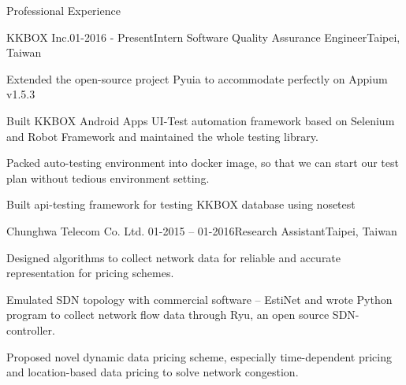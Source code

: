 \documentclass[letterpaper]{resume} %
\begin{document}
\begin{rSection}{Professional Experience}
\begin{rSubsection}{KKBOX Inc.}{01-2016 - Present}{Intern Software Quality Assurance Engineer}{Taipei, Taiwan}
\item Extended the open-source project Pyuia to accommodate perfectly on Appium v1.5.3
\item Built KKBOX Android Apps UI-Test automation framework based on Selenium and Robot Framework and maintained the whole testing library.
\item Packed auto-testing environment into docker image, so that we can start our test plan without tedious environment setting.
\item Built api-testing framework for testing KKBOX database using nosetest 
\end{rSubsection}
\vspace{-0.6\baselineskip}

\begin{rSubsection}{Chunghwa Telecom Co. Ltd.  \textnormal{}}{01-2015 -- 01-2016}{Research Assistant}{Taipei, Taiwan}
\item Designed algorithms to collect network data for reliable and accurate representation for pricing schemes.
\item Emulated SDN topology with commercial software -- EstiNet and wrote Python program to collect network flow data through Ryu, an open source SDN-controller.
\item Proposed novel dynamic data pricing scheme, especially time-dependent pricing and location-based data pricing to solve network congestion.
\end{rSubsection}

\end{rSection}
\vspace{-0.6\baselineskip}

\end{document}

